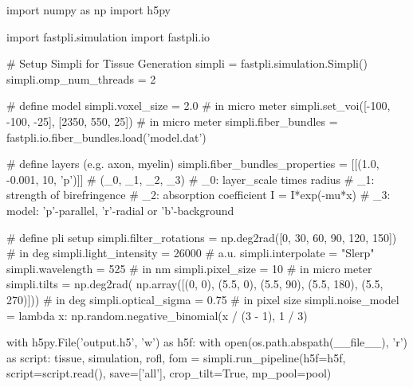 import numpy as np
import h5py

import fastpli.simulation
import fastpli.io

# Setup Simpli for Tissue Generation
simpli = fastpli.simulation.Simpli()
simpli.omp_num_threads = 2

# define model
simpli.voxel_size = 2.0  # in micro meter
simpli.set_voi([-100, -100, -25], [2350, 550, 25])  # in micro meter
simpli.fiber_bundles = fastpli.io.fiber_bundles.load('model.dat')

# define layers (e.g. axon, myelin)
simpli.fiber_bundles_properties = [[(1.0, -0.001, 10, 'p')]]
# (_0, _1, _2, _3)
# _0: layer_scale times radius
# _1: strength of birefringence
# _2: absorption coefficient I = I*exp(-mu*x)
# _3: model: 'p'-parallel, 'r'-radial or 'b'-background

# define pli setup
simpli.filter_rotations = np.deg2rad([0, 30, 60, 90, 120, 150])  # in deg
simpli.light_intensity = 26000  # a.u.
simpli.interpolate = "Slerp"
simpli.wavelength = 525  # in nm
simpli.pixel_size = 10  # in micro meter
simpli.tilts = np.deg2rad(
    np.array([(0, 0), (5.5, 0), (5.5, 90),
              (5.5, 180), (5.5, 270)]))  # in deg
simpli.optical_sigma = 0.75  # in pixel size
simpli.noise_model =
    lambda x: np.random.negative_binomial(x / (3 - 1), 1 / 3)

with h5py.File('output.h5', 'w') as h5f:
    with open(os.path.abspath(__file__), 'r') as script:
        tissue, simulation, rofl, fom = simpli.run_pipeline(h5f=h5f,
                                               script=script.read(),
                                               save=['all'],
                                               crop_tilt=True,
                                               mp_pool=pool)
